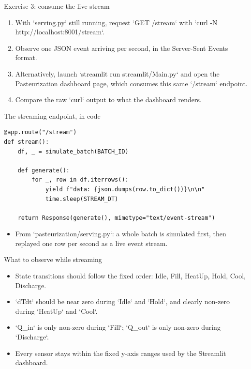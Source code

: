 \begin{frame}{Exercise 3: consume the live stream}
\begin{enumerate}
\item With `serving.py` still running, request `GET /stream` with `curl -N http://localhost:8001/stream`.
\item Observe one JSON event arriving per second, in the Server-Sent Events format.
\item Alternatively, launch `streamlit run streamlit/Main.py` and open the Pasteurization dashboard page, which consumes this same `/stream` endpoint.
\item Compare the raw `curl` output to what the dashboard renders.
\end{enumerate}
\coursefooter
\end{frame}

\begin{frame}[fragile]{The streaming endpoint, in code}
\begin{lstlisting}[style=coursepython]
@app.route("/stream")
def stream():
    df, _ = simulate_batch(BATCH_ID)

    def generate():
        for _, row in df.iterrows():
            yield f"data: {json.dumps(row.to_dict())}\n\n"
            time.sleep(STREAM_DT)

    return Response(generate(), mimetype="text/event-stream")
\end{lstlisting}
\begin{itemize}
\item From `pasteurization/serving.py`: a whole batch is simulated first, then replayed one row per second as a live event stream.
\end{itemize}
\coursefooter
\end{frame}

\begin{frame}{What to observe while streaming}
\begin{itemize}
\item State transitions should follow the fixed order: Idle, Fill, HeatUp, Hold, Cool, Discharge.
\item `dTdt` should be near zero during `Idle` and `Hold`, and clearly non-zero during `HeatUp` and `Cool`.
\item `Q\_in` is only non-zero during `Fill`; `Q\_out` is only non-zero during `Discharge`.
\item Every sensor stays within the fixed y-axis ranges used by the Streamlit dashboard.
\end{itemize}
\coursefooter
\end{frame}

